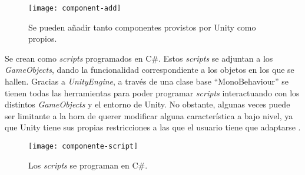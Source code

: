 \begin{figure}[h]
	\centering
	\texttt{[image: component-add]}
	\caption{Se pueden añadir tanto componentes provistos por Unity como propios.}
	\label{fig:component-add}
\end{figure}

Se crean como \textit{scripts} programados en C\#. Estos \textit{scripts} se adjuntan a los \textit{GameObjects}, dando la funcionalidad correspondiente a los objetos en los que se hallen. Gracias a \textit{UnityEngine}, a través de una clase base ``MonoBehaviour'' se tienen todas las herramientas para poder programar \textit{scripts} interactuando con los distintos \textit{GameObjects} y el entorno de Unity. No obstante, algunas veces puede ser limitante a la hora de querer modificar alguna característica a bajo nivel, ya que Unity tiene sus propias restricciones a las que el usuario tiene que adaptarse \cite{doc:scripts}.

\begin{figure}[h]
	\centering
	\texttt{[image: componente-script]}
	\caption{Los \textit{scripts} se programan en C\#.}
	\label{fig:componente-script}
\end{figure}

